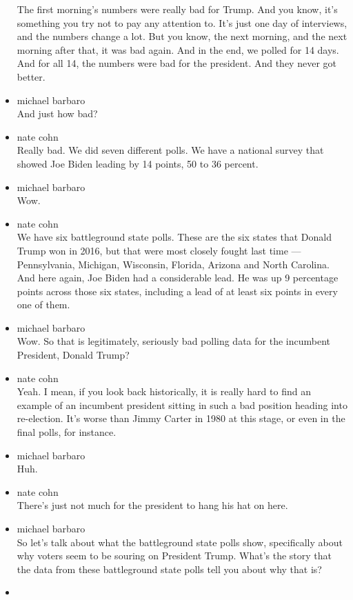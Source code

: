 \begin{itemize}
  The first morning's numbers were really bad for Trump. And you know,
  it's something you try not to pay any attention to. It's just one day
  of interviews, and the numbers change a lot. But you know, the next
  morning, and the next morning after that, it was bad again. And in the
  end, we polled for 14 days. And for all 14, the numbers were bad for
  the president. And they never got better.
\item
  michael barbaro\\
  And just how bad?
\item
  nate cohn\\
  Really bad. We did seven different polls. We have a national survey
  that showed Joe Biden leading by 14 points, 50 to 36 percent.
\item
  michael barbaro\\
  Wow.
\item
  nate cohn\\
  We have six battleground state polls. These are the six states that
  Donald Trump won in 2016, but that were most closely fought last time
  --- Pennsylvania, Michigan, Wisconsin, Florida, Arizona and North
  Carolina. And here again, Joe Biden had a considerable lead. He was up
  9 percentage points across those six states, including a lead of at
  least six points in every one of them.
\item
  michael barbaro\\
  Wow. So that is legitimately, seriously bad polling data for the
  incumbent President, Donald Trump?
\item
  nate cohn\\
  Yeah. I mean, if you look back historically, it is really hard to find
  an example of an incumbent president sitting in such a bad position
  heading into re-election. It's worse than Jimmy Carter in 1980 at this
  stage, or even in the final polls, for instance.
\item
  michael barbaro\\
  Huh.
\item
  nate cohn\\
  There's just not much for the president to hang his hat on here.
\item
  michael barbaro\\
  So let's talk about what the battleground state polls show,
  specifically about why voters seem to be souring on President Trump.
  What's the story that the data from these battleground state polls
  tell you about why that is?
\item

\end{itemize}
